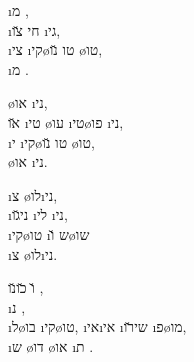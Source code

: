   \i{מ} ,\\
\i{חי}  \u{צו} \i{גי},\\
\i{צי} \i{קי}\o{טו} \u{נו} \o{טו},\\
  \i{מ} .

\o{או}  \i{ני},\\
\u{או} \i{טי} \o{עו} \i{טי}\o{פו} \i{ני},\\
\i{י} \i{קי}\o{טו} \u{נו} \o{טו},\\
 \o{או}  \i{ני}.

  \i{צ} \o{לו}\i{ני},\\
 \i{ני}\u{גו} \i{לי}  \i{ני},\\
\i{קי}\o{טו} \i{ש} \u{ו}\o{שו}\\
  \i{צ} \o{לו}\i{ני}.

\u{ו}  \u{כו}\u{נו}  ,\\
\i{נ}    ,\\
\i{ל}\o{בו} \i{קי}\o{טו}, \i{אי}\i{אי}  \i{שי}\u{רו}  \i{פ}\o{מו},\\
\i{ש} \o{דו} \o{או} \i{ת} .
